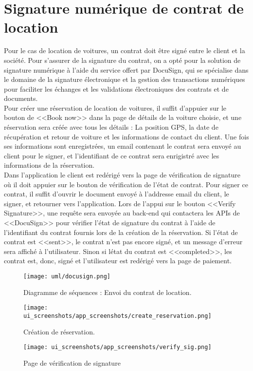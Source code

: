 \section{Signature numérique de contrat de location}
Pour le cas de location de voitures, un contrat doit être signé entre le client et la société. Pour s'assurer de la signature du contrat, on a opté pour la solution de signature numérique à l'aide du service offert par DocuSign, qui se spécialise dans le domaine de la signature électronique et la gestion des transactions numériques pour faciliter les échanges et les validations électroniques des contrats et de documents.\\
\noindent Pour créer une réservation de location de voitures, il suffit d'appuier sur le bouton de <<Book now>> dans la page de détails de la voiture choisie, et une réservation sera créée avec tous les détails : La position GPS, la date de récupération et retour de voiture et les informations de contact du client. Une fois ses informations sont enregistrées, un email contenant le contrat sera envoyé au client pour le signer, et l'identifiant de ce contrat sera enrigistré avec les informations de la réservation.\\
\noindent Dans l'application le client est redérigé vers la page de vérification de signature où il doit appuier sur le bouton de vérification de l'état de contrat. Pour signer ce contrat, il suffit d'ouvrir le document envoyé à l'addresse email du client, le signer, et retourner vers l'application. Lors de l'appui sur le bouton <<Verify Signature>>, une requête sera envoyée au back-end qui contactera les APIs de <<DocuSign>> pour vérifier l'état de signature du contrat à l'aide de l'identifiant du contrat fournis lors de la création de la réservation. Si l'état de contrat est <<sent>>, le contrat n'est pas encore signé, et un message d'erreur sera affiché à l'utilisateur. Sinon si létat du contrat est <<completed>>, les contrat est, donc, signé et l'utilisateur est redérigé vers la page de paiement.
\vspace{.5cm}
\begin{figure}[H]
    \centering
    \texttt{[image: uml/docusign.png]}
    \captionsetup{justification=centering}
    \caption{Diagramme de séquences : Envoi du contrat de location.}
    \label{fig:seq_location_contract}
\end{figure}
\clearpage
\begin{multicols}{2}
    \begin{figure}[H]
        \centering
        \texttt{[image: ui\_screenshots/app\_screenshots/create\_reservation.png]}
        \captionsetup{justification=centering}
        \caption{Création de réservation.}
        \label{fig:create_res}
    \end{figure}
    \begin{figure}[H]
        \centering
        \texttt{[image: ui\_screenshots/app\_screenshots/verify\_sig.png]}
        \captionsetup{justification=centering}
        \caption{Page de vérification de signature}
        \label{fig:verify_sig}
    \end{figure}
\end{multicols}
